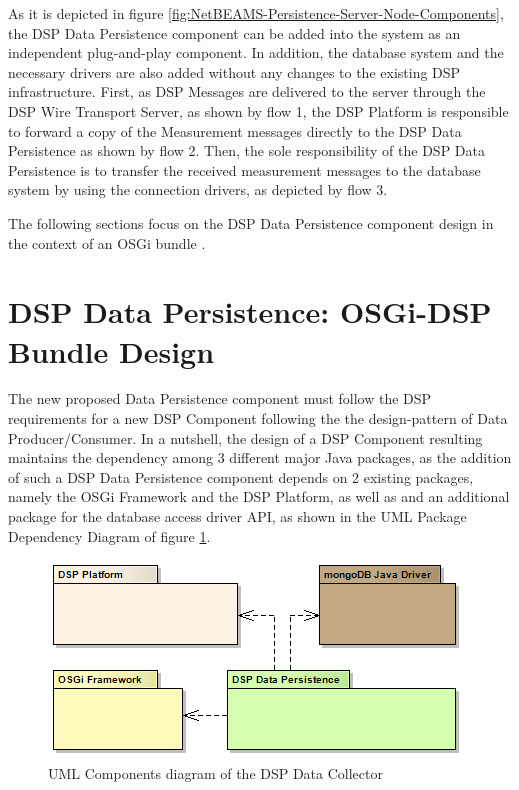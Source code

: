 As it is depicted in figure
\ref{fig:NetBEAMS-Persistence-Server-Node-Components}, the DSP Data
Persistence component can be added into the system as an independent
plug-and-play component. In addition, the database system and the necessary
drivers are also added without any changes to the existing DSP infrastructure.
First, as DSP Messages are delivered to the server through the DSP Wire
Transport Server, as shown by flow 1, the DSP Platform is responsible to
forward a copy of the Measurement messages directly to the DSP Data
Persistence as shown by flow 2. Then, the sole responsibility of the DSP Data
Persistence is to transfer the received measurement messages to the database
system by using the connection drivers, as depicted by flow 3.

The following sections focus on the DSP Data Persistence component design in
the context of an OSGi bundle \cite{osgi}.

\section{DSP Data Persistence: OSGi-DSP Bundle Design}

The new proposed Data Persistence component must follow the DSP requirements
for a new DSP Component following the the design-pattern of Data
Producer/Consumer. In a nutshell, the design of a DSP Component resulting
maintains the dependency among 3 different major Java packages, as the addition
of such a DSP Data Persistence component depends on 2 existing packages, namely
the OSGi Framework and the DSP Platform, as well as and an additional package
for the database access driver API, as shown in the UML Package Dependency
Diagram \cite{uml} of figure
\ref{fig:DSP-Data-Persistence-Packages-Dependency}.

\begin{figure}[!h]
  \centering
  \includegraphics[scale=0.5]{../diagrams/DSP-Data-Persistence-Packages-Dependency}
  \caption{UML Components diagram of the DSP Data Collector}
  \label{fig:DSP-Data-Persistence-Packages-Dependency}
\end{figure}

